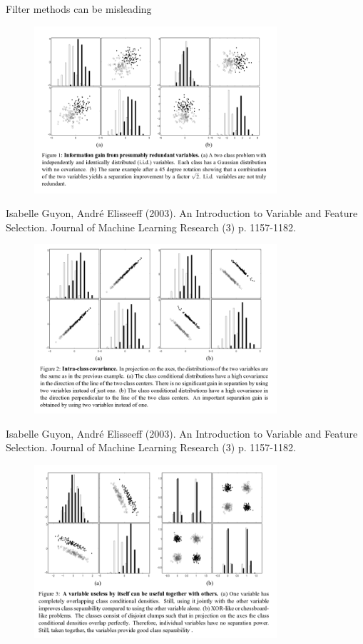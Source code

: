 \documentclass[11pt,compress,t,notes=noshow, xcolor=table]{beamer}
\begin{document}
  \begin{vbframe}{Filter methods can be misleading}

   \begin{figure}
     \includegraphics[width=9cm]{figure_man/varsel_ex0.png}
   \end{figure}

   \begin{center}
   \footnotesize{Isabelle Guyon, André Elisseeff (2003). An Introduction to Variable and Feature Selection.  Journal of Machine Learning Research (3) p. 1157-1182.}
   \end{center}

   \framebreak

   \begin{figure}
     \includegraphics[width=9cm]{figure_man/varsel_ex1.png}
   \end{figure}

   \begin{center}
   \footnotesize{Isabelle Guyon, André Elisseeff (2003). An Introduction to Variable and Feature Selection.  Journal of Machine Learning Research (3) p. 1157-1182.}
   \end{center}

   \framebreak

   \begin{figure}
     \includegraphics[width=9cm]{figure_man/varsel_ex2.png}
   \end{figure}


\end{vbframe}
\end{document}
